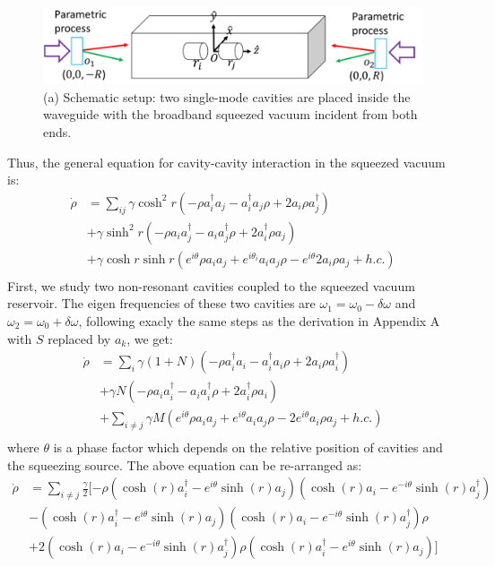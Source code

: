 \documentclass{article}
\begin{document}
\begin{figure}
\includegraphics[width=0.8\columnwidth]{fig3.png}
\caption{(a) Schematic setup: two single-mode cavities are placed inside the waveguide with the broadband squeezed vacuum incident from both ends.}
\label{3}
\end{figure}

Thus, the general equation for cavity-cavity interaction in the squeezed vacuum is:
\begin{equation}
\label{eq0}
\begin{split}
\dot{\rho}&=\sum_{ij}\gamma\cosh^{2}r(-\rho a_{i}^{\dagger}a_{j}-a_{i}^{\dagger}a_{j}\rho+2a_{i}\rho a_{j}^{\dagger})\\
&+\gamma\sinh^{2}r(-\rho a_{i}a_{j}^{\dagger}-a_{i}a_{j}^{\dagger}\rho+2a_{i}^{\dagger}\rho a_{j})\\
&+\gamma\cosh r\sinh r(e^{i\theta}\rho a_{i}a_{j}+e^{i\theta_{i}}a_{i}a_{j}\rho-e^{i\theta}2a_{i}\rho a_{j}+h.c.)\\
\end{split}
\end{equation}
First, we study two non-resonant cavities coupled to the squeezed vacuum reservoir. The eigen frequencies of these two cavities are $\omega_1=\omega_0-\delta \omega$ and $\omega_2=\omega_0+\delta \omega$, following exacly the same steps as the derivation in Appendix A with $S$ replaced by $a_k$, we get:
\begin{equation}
\label{eq6}
\begin{split}
\dot{\rho}&=\sum_{i}\gamma(1+N)(-\rho a_{i}^{\dagger}a_{i}-a_{i}^{\dagger}a_{i}\rho+2a_{i}\rho a_{i}^{\dagger})\\
&+\gamma N(-\rho a_{i}a_{i}^{\dagger}-a_{i}a_{i}^{\dagger}\rho+2a_{i}^{\dagger}\rho a_{i})\\
&+\sum_{i\ne j}\gamma M(e^{i\theta}\rho a_{i}a_{j}+e^{i\theta}a_{i}a_{j}\rho-2e^{i\theta}a_{i}\rho a_{j}+h.c.)\\
\end{split}
\end{equation}
where $\theta$ is a phase factor which depends on the relative position of cavities and the squeezing source. The above equation can be re-arranged as:
\begin{equation}
\label{eq7}
\begin{split}
\dot{\rho}&=\sum_{i\ne j}\frac{\gamma}{2}[-\rho(\cosh(r)a_{i}^{\dagger}-e^{i\theta}\sinh(r)a_{j})(\cosh(r)a_{i}-e^{-i\theta}\sinh(r)a_{j}^{\dagger})\\
&-(\cosh(r)a_{i}^{\dagger}-e^{i\theta}\sinh(r)a_{j})(\cosh(r)a_{i}-e^{-i\theta}\sinh(r)a_{j}^{\dagger})\rho\\
&+2(\cosh(r)a_{i}-e^{-i\theta}\sinh(r)a_{j}^{\dagger})\rho(\cosh(r)a_{i}^{\dagger}-e^{i\theta}\sinh(r)a_{j})]
\end{split}
\end{equation}
\end{document}
